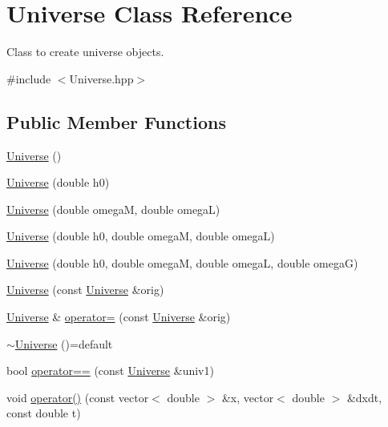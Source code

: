 \hypertarget{class_universe}{\section{Universe Class Reference}
\label{class_universe}
}


Class to create universe objects.  




{\ttfamily \#include $<$Universe.\-hpp$>$}

\subsection*{Public Member Functions}
\begin{DoxyCompactItemize}
\item 
\hyperlink{class_universe_a4d137a146dd3c2514dfb692dfbab6984}{Universe} ()
\item 
\hyperlink{class_universe_aa8287eefad81a39bd22e4fc4b3469913}{Universe} (double h0)
\item 
\hyperlink{class_universe_aa3a2ada69e53bfbe237755c821110d31}{Universe} (double omega\-M, double omega\-L)
\item 
\hyperlink{class_universe_a4d57eccd5bccb65a07ee8014d874f742}{Universe} (double h0, double omega\-M, double omega\-L)
\item 
\hyperlink{class_universe_a267e0955820c139f031d838894ae378e}{Universe} (double h0, double omega\-M, double omega\-L, double omega\-G)
\item 
\hyperlink{class_universe_a6deb72c0b3ae4774ca3608451fce7ce6}{Universe} (const \hyperlink{class_universe}{Universe} \&orig)
\item 
\hyperlink{class_universe}{Universe} \& \hyperlink{class_universe_a446172cfdff7993bf67e0ca200d784e0}{operator=} (const \hyperlink{class_universe}{Universe} \&orig)
\item 
\hyperlink{class_universe_af63f567a85ac8c644c446b1ff53995cf}{$\sim$\-Universe} ()=default
\item 
bool \hyperlink{class_universe_a8f7d3385d0a7adf659b4a68300f744e6}{operator==} (const \hyperlink{class_universe}{Universe} \&univ1)
\item 
void \hyperlink{class_universe_a45c5e437ac9f03652f753a5d86f314f0}{operator()} (const vector$<$ double $>$ \&x, vector$<$ double $>$ \&dxdt, const double t)
\end{DoxyCompactItemize}
